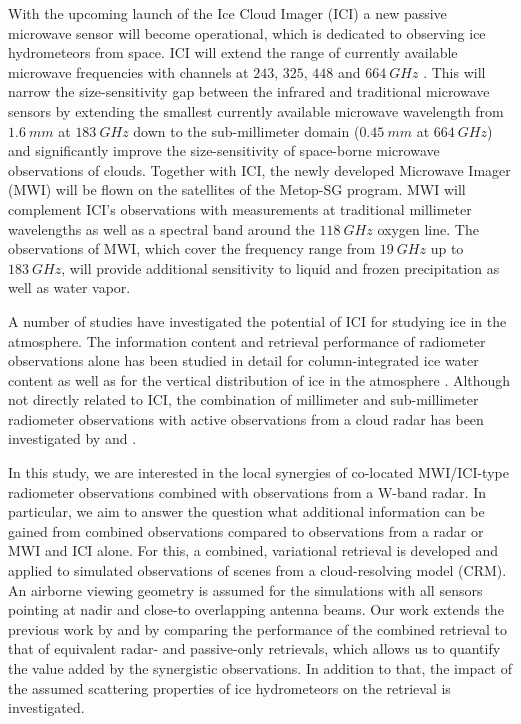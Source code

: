 \documentclass[journal abbreviation, manuscript]{copernicus}
\begin{document}
With the upcoming launch of the Ice Cloud Imager (ICI) a new passive microwave
sensor will become operational, which is dedicated to observing ice hydrometeors
from space. ICI will extend the range of currently available microwave
frequencies with channels at $243$, $325$, $448$ and $664\ \unit{GHz}$
\citep{eriksson20}. This will narrow the size-sensitivity gap between the
infrared and traditional microwave sensors by extending the smallest currently
available microwave wavelength from $1.6\ \unit{mm}$ at $183\ \unit{GHz}$ down
to the sub-millimeter domain ($0.45\ \unit{mm}$ at $664\ \unit{GHz}$) and
significantly improve the size-sensitivity of space-borne microwave observations
of clouds. Together with ICI, the newly developed Microwave Imager (MWI) will be
flown on the satellites of the Metop-SG program. MWI will complement ICI's
observations with measurements at traditional millimeter wavelengths as well as
a spectral band around the $118\ \unit{GHz}$ oxygen line. The observations
of MWI, which cover the frequency range from $19\ \unit{GHz}$ up to
$183\ \unit{GHz}$, will provide additional sensitivity to liquid and frozen
precipitation as well as water vapor.

A number of studies have investigated the potential of ICI for studying ice in
the atmosphere. The information content and retrieval performance of radiometer
observations alone has been studied in detail for column-integrated ice water
content \citep{jimenez07, wang17, brath18a, eriksson20} as well as for the
vertical distribution of ice in the atmosphere \citep{birman17, grutzun18,
  aires19}. Although not directly related to ICI, the combination of millimeter
and sub-millimeter radiometer observations with active observations from a cloud
radar has been investigated by \cite{evans05} and \cite{jiang19}.

In this study, we are interested in the local synergies of co-located
MWI/ICI-type radiometer observations combined with observations from a W-band
radar. In particular, we aim to answer the question what additional information
can be gained from combined observations compared to observations from a radar
or MWI and ICI alone. For this, a combined, variational retrieval is developed
and applied to simulated observations of scenes from a cloud-resolving model
(CRM). An airborne viewing geometry is assumed for the simulations with all
sensors pointing at nadir and close-to overlapping antenna beams. Our work
extends the previous work by \citet{evans05} and \citet{jiang19} by comparing
the performance of the combined retrieval to that of equivalent radar- and
passive-only retrievals, which allows us to quantify the value added by the
synergistic observations. In addition to that, the impact of the assumed
scattering properties of ice hydrometeors on the retrieval is investigated.
\end{document}
